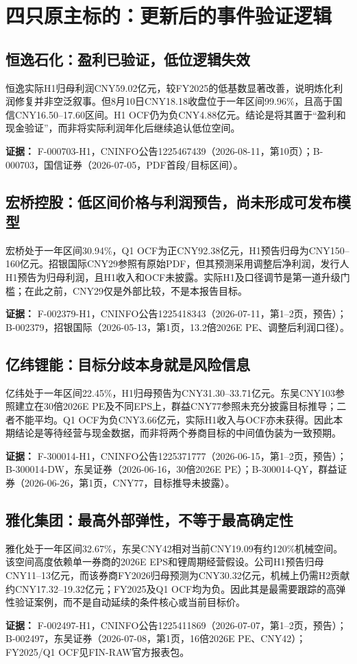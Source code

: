 \chapter{四只原主标的：更新后的事件验证逻辑}

\section{恒逸石化：盈利已验证，低位逻辑失效}

恒逸实际H1归母利润CNY59.02亿元，较FY2025的低基数显著改善，说明炼化利润修复并非空泛叙事。但8月10日CNY18.18收盘位于一年区间99.96\%，且高于国信CNY16.50--17.60区间。H1 OCF仍为负CNY4.88亿元。结论是将其置于“盈利和现金验证”，而非将实际利润年化后继续追认低位空间。

\textbf{证据：} F-000703-H1，CNINFO公告1225467439（2026-08-11，第10页）；B-000703，国信证券（2026-07-05，PDF首段/目标区间）。

\section{宏桥控股：低区间价格与利润预告，尚未形成可发布模型}

宏桥处于一年区间30.94\%，Q1 OCF为正CNY92.38亿元，H1预告归母为CNY150--160亿元。招银国际CNY29参照有原始PDF，但其预测采用调整后净利润，发行人H1预告为归母利润，且H1收入和OCF未披露。实际H1及口径调节是第一道升级门槛；在此之前，CNY29仅是外部比较，不是本报告目标。

\textbf{证据：} F-002379-H1，CNINFO公告1225418343（2026-07-11，第1--2页，预告）；B-002379，招银国际（2026-05-13，第1页，13.2倍2026E PE、调整后利润口径）。

\section{亿纬锂能：目标分歧本身就是风险信息}

亿纬处于一年区间22.45\%，H1归母预告为CNY31.30--33.71亿元。东吴CNY103参照建立在30倍2026E PE及不同EPS上，群益CNY77参照未充分披露目标推导；二者不能平均。Q1 OCF为负CNY3.66亿元，实际H1收入与OCF亦未获得。因此本期结论是等待经营与现金数据，而非将两个券商目标的中间值伪装为一致预期。

\textbf{证据：} F-300014-H1，CNINFO公告1225371777（2026-06-15，第1--2页，预告）；B-300014-DW，东吴证券（2026-06-16，30倍2026E PE）；B-300014-QY，群益证券（2026-06-26，第1页，CNY77，目标推导未披露）。

\section{雅化集团：最高外部弹性，不等于最高确定性}

雅化处于一年区间32.67\%，东吴CNY42相对当前CNY19.09有约120\%机械空间。该空间高度依赖单一券商的2026E EPS和锂周期经营假设。公司H1预告归母CNY11--13亿元，而该券商FY2026归母预测为CNY30.32亿元，机械上仍需H2贡献约CNY17.32--19.32亿元；FY2025及Q1 OCF均为负。因此其是最需要跟踪的高弹性验证案例，而不是自动延续的条件核心或当前目标价。

\textbf{证据：} F-002497-H1，CNINFO公告1225411869（2026-07-07，第1--2页，预告）；B-002497，东吴证券（2026-07-08，第1页，16倍2026E PE、CNY42）；FY2025/Q1 OCF见FIN-RAW官方报表包。
